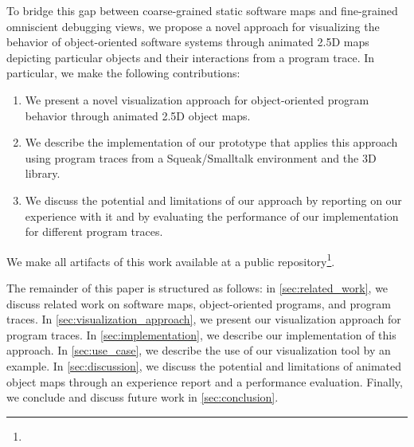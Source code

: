 To bridge this gap between coarse-grained static software maps and fine-grained omniscient debugging views, we propose a novel approach for visualizing the behavior of object-oriented software systems through animated 2.5D maps depicting particular objects and their interactions from a program trace.
In particular, we make the following contributions:

\begin{enumerate}
	\item We present a novel visualization approach for ob\-ject-ori\-ent\-ed program behavior through animated 2.5D object maps.
	\item We describe the implementation of our prototype \tfd{} that applies this approach using program traces from a Squeak/\?Smalltalk environment and the  3D library.
	\item We discuss the potential and limitations of our approach by reporting on our experience with it and by evaluating the performance of our implementation for different program traces.
\end{enumerate}

We make all artifacts of this work available at a public repository\footnote{}.

The remainder of this paper is structured as follows:
in \cref{sec:related_work}, we discuss related work on software maps, object-oriented programs, and program traces.
In \cref{sec:visualization_approach}, we present our visualization approach for program traces.
In \cref{sec:implementation}, we describe our implementation of this approach.
In \cref{sec:use_case}, we describe the use of our visualization tool by an example.
In \cref{sec:discussion}, we discuss the potential and limitations of animated object maps through an experience report and a performance evaluation.
Finally, we conclude and discuss future work in \cref{sec:conclusion}.
